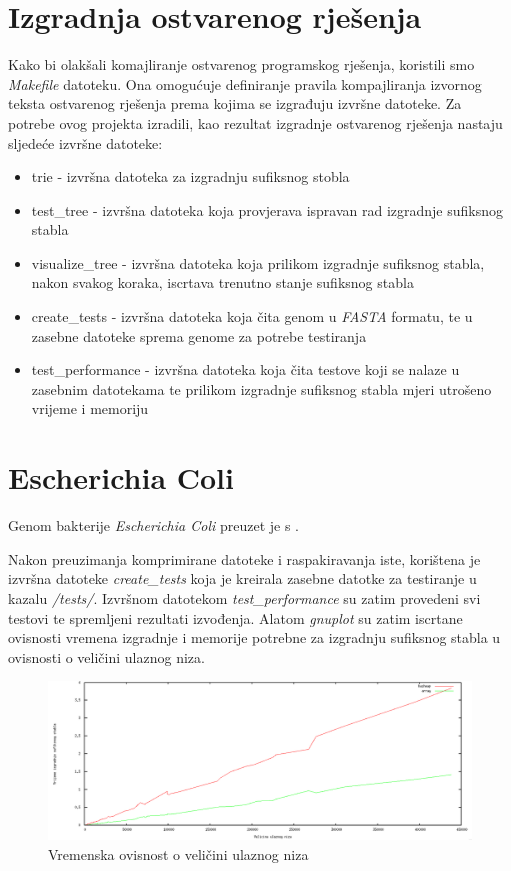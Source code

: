 \documentclass[times, utf8, seminar, numeric]{fer}
\begin{document}
\section{Izgradnja ostvarenog rješenja}
	Kako bi olakšali komajliranje ostvarenog programskog rješenja, koristili smo \textit{Makefile} datoteku. Ona omogućuje definiranje pravila kompajliranja izvornog teksta ostvarenog rješenja prema kojima se izgrađuju izvršne datoteke. Za potrebe ovog projekta izradili, kao rezultat izgradnje ostvarenog rješenja nastaju sljedeće izvršne datoteke:
\begin{itemize}
	\item trie - izvršna datoteka za izgradnju sufiksnog stobla
	\item test\_tree - izvršna datoteka koja provjerava ispravan rad izgradnje sufiksnog stabla
	\item visualize\_tree - izvršna datoteka koja prilikom izgradnje sufiksnog stabla, nakon svakog koraka, iscrtava trenutno stanje sufiksnog stabla
	\item create\_tests - izvršna datoteka koja čita genom u \textit{FASTA} formatu, te u zasebne datoteke sprema genome za potrebe testiranja
	\item test\_performance - izvršna datoteka koja čita testove koji se nalaze u zasebnim datotekama te prilikom izgradnje sufiksnog stabla mjeri utrošeno vrijeme i memoriju
\end{itemize}

\section{Escherichia Coli}
	Genom bakterije \textit{Escherichia Coli} preuzet je s \cite{ecoli}. 
	
	Nakon preuzimanja komprimirane datoteke i raspakiravanja iste, korištena je izvršna datoteke \textit{create\_tests} koja je kreirala zasebne datotke za testiranje u kazalu \textit{/tests/}. Izvršnom datotekom \textit{test\_performance} su zatim provedeni svi testovi te spremljeni rezultati izvođenja. Alatom \textit{gnuplot} su zatim iscrtane ovisnosti vremena izgradnje i memorije potrebne za izgradnju sufiksnog stabla u ovisnosti o veličini ulaznog niza.

\begin{figure}[h!]	
	\centering
	\includegraphics[width=1\textwidth]{media/time_1.png}
	\caption{Vremenska ovisnost o veličini ulaznog niza}
	\label{image:time}
\end{figure}
\end{document}
